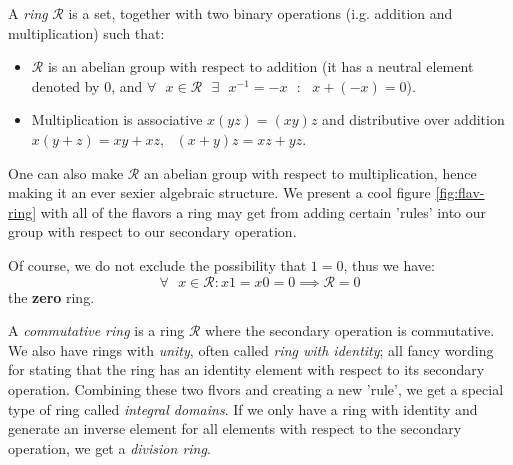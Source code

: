 \vspace{0.3cm}

\begin{definition}

    A \textit{ring} $\mathcal{R}$ is a set, together with two binary operations (i.g. addition and multiplication) such that:

    \begin{itemize}
        \item $\mathcal{R}$ is an abelian group with respect to addition (it has a neutral element denoted by 0, and $\forall \text{ } x \in \mathcal{R} \text{  } \exists \text{  } x^{-1}=-x \text{ }: \text{ } x+(-x)=0 $).
        \item Multiplication is associative $x(yz)=(xy)z$ and distributive over addition $x(y+z)=xy+xz, \text{  } (x+y)z=xz+yz$.
    \end{itemize}

\end{definition}

\vspace{0.3cm}

One can also make $\mathcal{R}$ an abelian group with respect to multiplication, hence making it an ever sexier algebraic structure. We present a cool figure \ref{fig:flav-ring}
with all of the flavors a ring may get from adding certain 'rules' into our group with respect to our secondary operation.

\vspace{0.3cm}
    
\begin{remark} 
    Of course, we do not exclude the possibility that $1=0$, thus we have: $$\forall \text{ } x \in \mathcal{R}:x1=x0=0 \implies \mathcal{R} = 0$$
    the \textbf{zero} ring.
\end{remark}

\vspace{0.3cm}

A \textit{commutative ring} is a ring $\mathcal{R}$ where the secondary operation is commutative. We also have rings with \textit{unity}, often called \textit{ring with identity}; all 
fancy wording for stating that the ring has an identity element with respect to its secondary operation. Combining these two flvors and creating a new 'rule', we get a special type of ring called 
\textit{integral domains}. If we only have a ring with identity and generate an inverse element for all elements with respect to the secondary operation, we get a \textit{division ring}.

